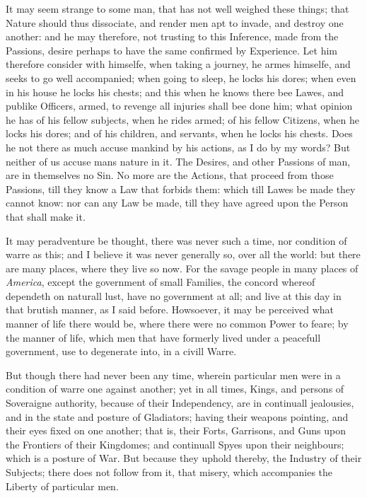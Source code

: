 It may seem strange to some man, that has not well weighed these
things; that Nature should thus dissociate, and render men apt to
invade, and destroy one another: and he may therefore, not trusting to
this Inference, made from the Passions, desire perhaps to have the
same confirmed by Experience. Let him therefore consider with
himselfe, when taking a journey, he armes himselfe, and seeks to go
well accompanied; when going to sleep, he locks his dores; when even
in his house he locks his chests; and this when he knows there bee
Lawes, and publike Officers, armed, to revenge all injuries shall bee
done him; what opinion he has of his fellow subjects, when he rides
armed; of his fellow Citizens, when he locks his dores; and of his
children, and servants, when he locks his chests. Does he not there as
much accuse mankind by his actions, as I do by my words? But neither
of us accuse mans nature in it. The Desires, and other Passions of
man, are in themselves no Sin. No more are the Actions, that proceed
from those Passions, till they know a Law that forbids them: which
till Lawes be made they cannot know: nor can any  Law be
made, till they have agreed upon the Person that shall make it.

It may peradventure be thought, there was never such a time, nor
condition of warre as this; and I believe it was never generally so,
over all the world: but there are many places, where they live so now.
For the savage people in many places of \textit{America}, except the
government of small Families, the concord whereof dependeth on
naturall lust, have no government at all; and live at this day in that
brutish manner, as I said before. Howsoever, it may be perceived what
manner of life there would be, where there were no common Power to
feare; by the manner of life, which men that have formerly lived under
a peacefull government, use to degenerate into, in a civill Warre.

But though there had never been any time, wherein particular men were
in a condition of warre one against another; yet in all times, Kings,
and persons of Soveraigne authority, because of their Independency,
are in continuall jealousies, and in the state and posture of
Gladiators; having their weapons pointing, and their eyes fixed on one
another; that is, their Forts, Garrisons, and Guns upon the Frontiers
of their Kingdomes; and continuall Spyes upon their neighbours; which
is a posture of War. But because they uphold thereby, the Industry of
their Subjects; there does not follow from it, that misery, which
accompanies the Liberty of particular men.

